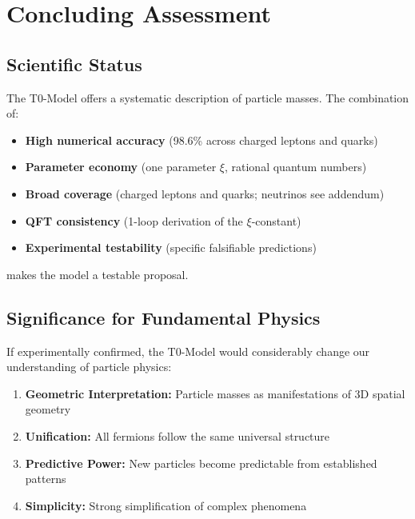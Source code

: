 	\section{Concluding Assessment}
	\label{sec:concluding_assessment}
	
	\subsection{Scientific Status}
	\label{subsec:scientific_status}
	
	The T0-Model offers a systematic description of particle masses. The combination of:
	
	\begin{itemize}
		\item \textbf{High numerical accuracy} (98.6\% across charged leptons and quarks)
		\item \textbf{Parameter economy} (one parameter $\xi$, rational quantum numbers)
		\item \textbf{Broad coverage} (charged leptons and quarks; neutrinos see addendum)
		\item \textbf{QFT consistency} (1-loop derivation of the $\xi$-constant)
		\item \textbf{Experimental testability} (specific falsifiable predictions)
	\end{itemize}
	
	makes the model a testable proposal.
	
	\subsection{Significance for Fundamental Physics}
	\label{subsec:significance_physics}
	
	If experimentally confirmed, the T0-Model would considerably change our understanding of particle physics:
	
	\begin{enumerate}
		\item \textbf{Geometric Interpretation:} Particle masses as manifestations of 3D spatial geometry
		\item \textbf{Unification:} All fermions follow the same universal structure
		\item \textbf{Predictive Power:} New particles become predictable from established patterns
		\item \textbf{Simplicity:} Strong simplification of complex phenomena
	\end{enumerate}
	
